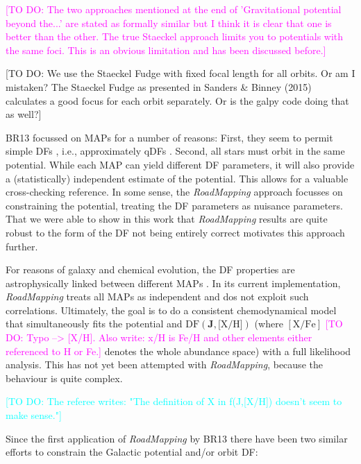\documentclass[iop,revtex4]{emulateapj}
\newcommand{\vect}[1]{\boldsymbol{#1}}
\newcommand{\MAP}{MAP}
\newcommand{\MAPs}{MAPs}
\newcommand{\RM}{{\sl RoadMapping}}
\newcommand{\HW}[1]{\textcolor{Cyan}{#1}}
\newcommand{\Jo}[1]{\textcolor{YellowOrange}{#1}}
\newcommand{\Wilma}[1]{\textcolor{Magenta}{#1}}
\begin{document}
\Wilma{[TO DO: The two approaches mentioned at the end of 'Gravitational potential beyond the...' are stated as formally similar but I think it is clear that one is better than the other. The true Staeckel approach limits you to potentials with the same foci. This is an obvious limitation and has been discussed before.]}

\Jo{[TO DO: We use the Staeckel Fudge with fixed focal length for all orbits. Or am I mistaken? The Staeckel Fudge as presented in Sanders \& Binney (2015) calculates a good focus for each orbit separately. Or is the galpy code doing that as well?]}

 BR13 focussed on \MAPs{} for a number of reasons: First, they seem to permit simple DFs \citep{2012ApJ...751..131B,2012ApJ...755..115B,2012ApJ...753..148B}, i.e., approximately qDFs \citep{2013MNRAS.434..652T}. Second, all stars must orbit in the same potential. While each \MAP{} can yield different DF parameters, it will also provide a (statistically) independent estimate of the potential. This allows for a valuable cross-checking reference. In some sense, the \RM{} approach focusses on constraining the potential, treating the DF parameters as nuisance parameters. That we were able to show in this work that \RM{} results are quite robust to the form of the DF not being entirely correct motivates this approach further. 

For reasons of galaxy and chemical evolution, the DF properties are astrophysically linked between different \MAPs{} \citep{2015MNRAS.449.3479S}. In its current implementation, \RM{} treats all \MAPs{} as independent and dos not exploit such correlations. Ultimately, the goal is to do a consistent chemodynamical model that simultaneously fits the potential and $\text{DF}(\vect{J},\text{[X/H]})$ (where $[\mathrm{X}/\mathrm{Fe}]$ \Wilma{[TO DO: Typo --> [X/H]. Also write: x/H is Fe/H and other elements either referenced to H or Fe.]} denotes the whole abundance space) with a full likelihood analysis. This has not yet been attempted with \RM{}, because the behaviour is quite complex. 

\HW{[TO DO: The referee writes: "The definition of X in f(J,[X/H]) doesn't seem to make sense."]}

Since the first application of \RM{} by BR13 there have been two similar efforts to constrain the Galactic potential and/or orbit DF:
\end{document}
